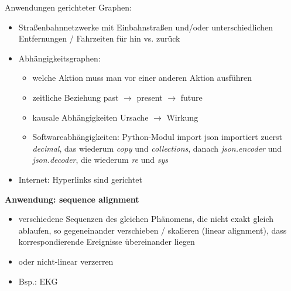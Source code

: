 \documentclass[11pt, fleqn]{scrreprt}
\begin{document}
    Anwendungen gerichteter Graphen:
    \begin{itemize}
        \item Straßenbahnnetzwerke mit Einbahnstraßen und/oder unterschiedlichen Entfernungen / Fahrzeiten für hin vs. zurück
        \item Abhängigkeitsgraphen:
        \begin{itemize}
            \item welche Aktion muss man vor einer anderen Aktion ausführen
            \item zeitliche Beziehung \hspace*{1cm}past $\rightarrow$ present $\rightarrow$ future
            \item kausale Abhängigkeiten \hspace*{0.1cm} Ursache $\rightarrow$ Wirkung
            \item Softwareabhängigkeiten: Python-Modul import json importiert zuerst \emph{decimal}, das wiederum \emph{copy} und \emph{collections}, danach \emph{json.encoder} und \emph{json.decoder}, die wiederum \emph{re} und \emph{sys}
        \end{itemize}
        \item Internet: Hyperlinks sind gerichtet
    \end{itemize}

    \textbf{Anwendung: sequence alignment}
    \begin{itemize}
        \item verschiedene Sequenzen des gleichen Phänomens, die nicht exakt gleich ablaufen, so gegeneinander verschieben / skalieren (linear alignment), dass korrespondierende Ereignisse übereinander liegen
        \item oder nicht-linear verzerren
        \item Bsp.: EKG
    \end{itemize}
\end{document}

